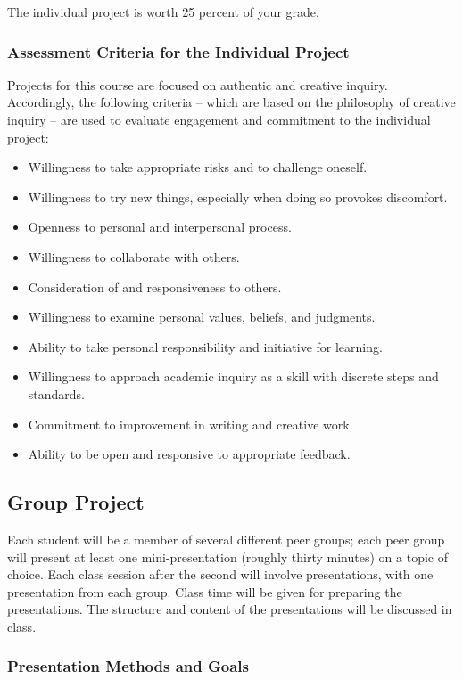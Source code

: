 \documentclass[letterpaper,10pt,headsepline]{scrreprt}
\begin{document}
The individual project is worth 25 percent of your grade.

\subsubsection{Assessment Criteria for the Individual Project}

Projects for this course are focused on authentic and creative inquiry. Accordingly, the following criteria -- which are based on the philosophy of creative inquiry  --  are used to evaluate engagement and commitment to the individual project:

\begin{itemize}
\item Willingness to take appropriate risks and to challenge oneself.
\item Willingness to try new things, especially when doing so provokes discomfort.
\item Openness to personal and interpersonal process.
\item Willingness to collaborate with others.
\item Consideration of and responsiveness to others.
\item Willingness to examine personal values, beliefs, and judgments.
\item Ability to take personal responsibility and initiative for learning.
\item Willingness to approach academic inquiry as a skill with discrete steps and standards.
\item Commitment to improvement in writing and creative work.
\item Ability to be open and responsive to appropriate feedback.
\end{itemize}

\subsection{Group Project}

Each student will be a member of several different peer groups; each peer group will present at least one mini-presentation (roughly thirty minutes) on a topic of choice. Each class session after the second will involve presentations, with one presentation from each group. Class time will be given for preparing the presentations. The structure and content of the presentations will be discussed in class.

\subsubsection{Presentation Methods and Goals}
\end{document}
